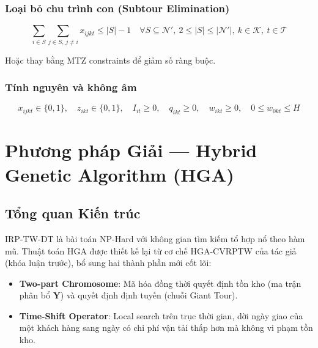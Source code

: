 \documentclass[12pt,a4paper]{article}
\newcommand{\boldterm}[1]{\textbf{\color{primary}#1}}
\newcommand{\T}{\mathcal{T}}
\newcommand{\N}{\mathcal{N}}
\newcommand{\K}{\mathcal{K}}
\begin{document}
\subsubsection{Loại bỏ chu trình con (Subtour Elimination)}

\begin{equation}
  \sum_{i \in S} \sum_{j \in S,\, j \neq i} x_{ijkt} \leq |S| - 1
  \quad \forall S \subseteq \N',\ 2 \leq |S| \leq |\N'|,\ k \in \K,\ t \in \T
  \label{eq:sec}
\end{equation}

\noindent Hoặc thay bằng MTZ constraints để giảm số ràng buộc.

\subsubsection{Tính nguyên và không âm}

\begin{equation}
  x_{ijkt} \in \{0,1\},\quad z_{ikt} \in \{0,1\},\quad
  I_{it} \geq 0,\quad q_{ikt} \geq 0,\quad w_{ikt} \geq 0,\quad 0 \leq w_{0kt} \leq H
  \label{eq:integrality}
\end{equation}

\section{Phương pháp Giải --- Hybrid Genetic Algorithm (HGA)}

\subsection{Tổng quan Kiến trúc}

IRP-TW-DT là bài toán NP-Hard với không gian tìm kiếm tổ hợp nổ theo hàm mũ.
Thuật toán HGA được thiết kế lại từ cơ chế HGA-CVRPTW của tác giả
(khóa luận trước), bổ sung hai thành phần mới cốt lõi:

\begin{itemize}[leftmargin=*]
  \item \boldterm{Two-part Chromosome}: Mã hóa đồng thời quyết định tồn kho (ma trận
        phân bổ $\mathbf{Y}$) và quyết định định tuyến (chuỗi Giant Tour).
  \item \boldterm{Time-Shift Operator}: Local search trên trục thời gian, dời ngày giao
        của một khách hàng sang ngày có chi phí vận tải thấp hơn mà không vi phạm tồn kho.
\end{itemize}
\end{document}
